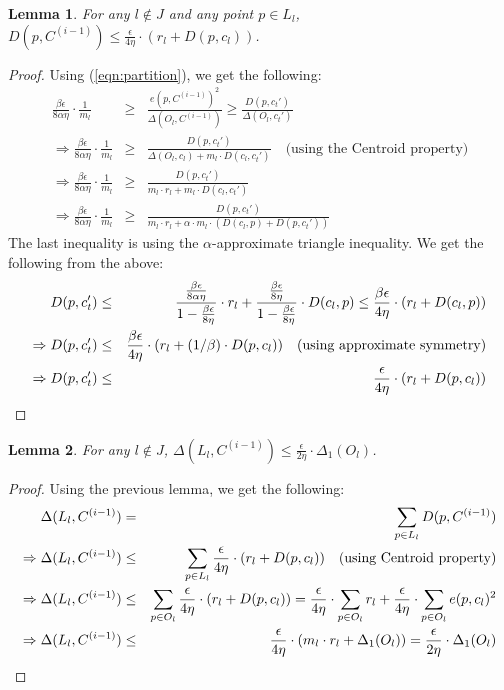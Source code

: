 \documentclass[11pt]{article}
\newtheorem{lemma}{Lemma}
\newcommand{\eps}{{\epsilon}}
\newcommand{\C}[1]{{{C}^{(#1)}}}
\begin{document}
\begin{lemma}
\label{lem:key-repeat}
For any $l \notin  J$ and any point $p \in L_l$, $D(p, \C{i-1}) \leq \frac{\eps}{4 \eta} \cdot (r_l + D(p, c_l))$.
\end{lemma}
\begin{proof}
Using (\ref{eqn:partition}), we get the following:
\begin{eqnarray*}
\frac{\beta \eps}{8 \alpha \eta} \cdot \frac{1}{m_l} 
&\geq& \frac{e(p, C^{(i-1)})^2}{\Delta(O_l, C^{(i-1)})}
\geq \frac{D(p, c_t')}{\Delta(O_l, c_t')} \\
\Rightarrow \frac{\beta \eps}{8 \alpha \eta} \cdot \frac{1}{m_l}  
&\geq& \frac{D(p, c_t')}{\Delta(O_l, c_l) + m_l \cdot D(c_l, c_t')} \quad \textrm{(using the Centroid property)} \\
\Rightarrow \frac{\beta \eps}{8 \alpha \eta} \cdot \frac{1}{m_l}  
&\geq& \frac{D(p, c_t')}{m_l \cdot r_l + m_l \cdot D(c_l, c_t')} \\
\Rightarrow \frac{\beta \eps}{8 \alpha \eta} \cdot \frac{1}{m_l}  
&\geq& \frac{D(p, c_t')}{m_l \cdot r_l + \alpha \cdot m_l \cdot (D(c_l, p) + D(p, c_t'))}
\end{eqnarray*}
The last inequality is using the $\alpha$-approximate triangle inequality. 
We get the following from the above:
\begin{eqnarray*}
D(p, c_t') &\leq& \frac{\frac{\beta \eps}{8 \alpha \eta}}{1-\frac{\beta \eps}{8 \eta}} \cdot r_l + \frac{\frac{\beta \eps}{8\eta}}{1-\frac{\beta \eps}{8 \eta}} \cdot D(c_l, p) 
\leq \frac{\beta \eps}{4 \eta} \cdot (r_l + D(c_l, p)) \nonumber \\
\Rightarrow D(p, c_t') &\leq& \frac{\beta \eps}{4 \eta} \cdot (r_l + (1/\beta) \cdot D(p, c_l)) \quad \textrm{(using approximate symmetry)} \nonumber \\
\Rightarrow D(p, c_t') &\leq& \frac{\eps}{4 \eta} \cdot (r_l + D(p, c_l)) \qedhere
\end{eqnarray*}
\end{proof}

\begin{lemma}
For any $l \notin J$, $\Delta(L_l, C^{(i-1)}) \leq \frac{\eps}{2 \eta} \cdot \Delta_1(O_l)$.
\end{lemma}
\begin{proof}
Using the previous lemma, we get the following:
\begin{eqnarray*}
\Delta(L_l, C^{(i-1)}) 
&=& \sum_{p \in L_l} D(p, C^{(i-1)}) \\
\Rightarrow \Delta(L_l, C^{(i-1)})  
&\leq& \sum_{p \in L_l} \frac{\eps}{4\eta} \cdot (r_l + D(p, c_l)) \quad \textrm{(using Centroid property)} \\
\Rightarrow \Delta(L_l, C^{(i-1)})   
&\leq& \sum_{p \in O_l} \frac{\eps}{4 \eta} \cdot (r_l + D(p, c_l))
= \frac{\eps}{4 \eta} \cdot \sum_{p \in O_l}  r_l + \frac{\eps}{4 \eta} \cdot  \sum_{p \in O_l} e(p, c_l)^2 \\
\Rightarrow \Delta(L_l, C^{(i-1)})    
&\leq& \frac{\eps}{4 \eta} \cdot (m_l \cdot r_l + \Delta_1(O_l))
= \frac{\eps}{2 \eta} \cdot \Delta_1(O_l) \qedhere
\end{eqnarray*}
\end{proof}
\end{document}
